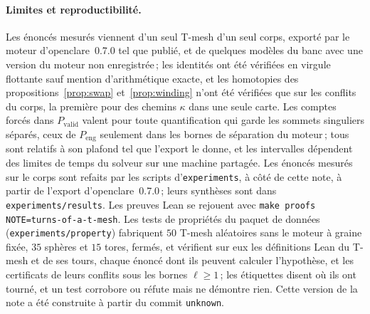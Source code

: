 \documentclass[11pt,a4paper]{article}
\providecommand{\enginecommit}{unknown}
\begin{document}
\paragraph{Limites et reproductibilité.}
Les énoncés mesurés viennent d'un seul T-mesh d'un seul corps, exporté par le
moteur d'openclare~0.7.0 tel que publié, et de quelques modèles du banc avec
une version du moteur non enregistrée\,; les identités
ont été vérifiées en virgule flottante sauf mention d'arithmétique exacte, et
les homotopies des propositions~\ref{prop:swap} et~\ref{prop:winding} n'ont
été vérifiées que sur les conflits du corps, la première pour des chemins
$\kappa$ dans une seule carte. Les comptes forcés dans $P_{\mathrm{valid}}$ valent pour
toute quantification qui garde les sommets singuliers séparés, ceux de
$P_{\mathrm{eng}}$ seulement dans les bornes de séparation du moteur\,; tous
sont relatifs à son plafond tel que l'export le donne, et les intervalles
dépendent des limites de temps du solveur sur une machine partagée. Les
énoncés mesurés sur le corps sont refaits par les scripts
d'\texttt{experiments}, à côté de cette note, à partir de l'export
d'openclare~0.7.0\,; leurs synthèses sont dans
\texttt{experiments/results}. Les preuves Lean se
rejouent avec \texttt{make proofs NOTE=turns-of-a-t-mesh}. Les tests de
propriétés du paquet de données (\texttt{experiments/property}) fabriquent
$50$ T-mesh aléatoires sans le moteur à graine fixée, $35$ sphères et $15$
tores, fermés, et vérifient sur eux les définitions Lean du T-mesh et de ses
tours, chaque énoncé dont ils peuvent calculer l'hypothèse, et les certificats
de leurs conflits sous les bornes $\ell \ge 1$\,; les étiquettes disent où
ils ont tourné, et un test corrobore ou réfute mais ne démontre rien. Cette
version de la
note a été construite à partir du commit \texttt{\enginecommit}.
\end{document}
